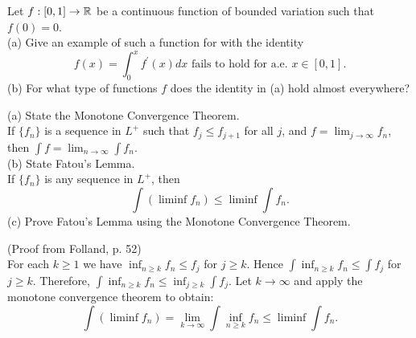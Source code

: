 \begin{list}
\begin{pf}
\end{pf} 
 \item Let $f:[0,1]\rightarrow {\mathbb R}$ be a continuous function of bounded variation such that $f(0)=0$. \\
 (a) Give an example of such a function for with the identity 
 \[
 f(x)=\int_0^x f^{'}(x)dx \text{ fails to hold for a.e. } x \in [0,1].
 \]
 (b) For what type of functions $f$ does the identity in (a) hold almost everywhere?
 \item (a) State the Monotone Convergence Theorem.\\
 If $\{f_n\}$ is a sequence in $L^+$ such that $f_j \leq f_{j+1}$ for all $j$, and $f = \lim_{j \rightarrow \infty}f_n$, then $\int f = \lim_{n \rightarrow \infty} \int f_n$.\\
 (b) State Fatou's Lemma.\\
 If $\{f_n\}$ is any sequence in $L^+$, then 
	\[
	\int(\liminf f_n) \leq \liminf \int f_n.
	\]
 (c) Prove Fatou's Lemma using the Monotone Convergence Theorem.
 \begin{pf} (Proof from Folland, p. 52) \\
 For each $k \geq 1$ we have $\inf_{n \geq k} f_n \leq f_j$ for $j \geq k$. Hence $\int \inf_{n \geq k} f_n \leq \int f_j$ for $j \geq k$. Therefore, $\int \inf_{n \geq k}f_n \leq \inf_{j \geq k} \int f_j$. Let $k \rightarrow \infty$ and apply the monotone convergence theorem to obtain: \[
 \int (\liminf f_n) = \lim_{k \rightarrow \infty}\int \inf_{n \geq k} f_n \leq \liminf \int f_n.
 \]	
 \end{pf}


\end{list}
